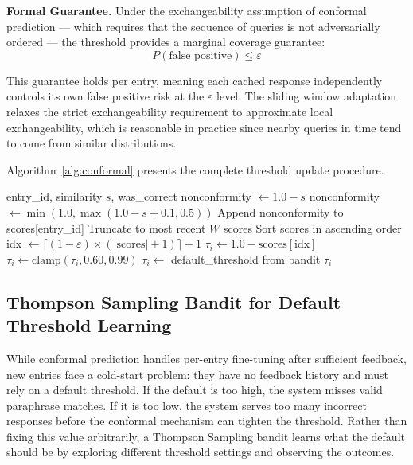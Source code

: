 \documentclass[conference]{IEEEtran}
\begin{document}
\textbf{Formal Guarantee.} Under the exchangeability assumption of conformal prediction --- which requires that the sequence of queries is not adversarially ordered --- the threshold provides a marginal coverage guarantee:
\begin{equation}
P(\text{false positive}) \leq \varepsilon
\label{eq:guarantee}
\end{equation}

This guarantee holds per entry, meaning each cached response independently controls its own false positive risk at the $\varepsilon$ level. The sliding window adaptation relaxes the strict exchangeability requirement to approximate local exchangeability, which is reasonable in practice since nearby queries in time tend to come from similar distributions.

Algorithm~\ref{alg:conformal} presents the complete threshold update procedure.

\begin{algorithm}[t]
\caption{Conformal Threshold Update}
\label{alg:conformal}
\begin{algorithmic}[1]
\REQUIRE entry\_id, similarity $s$, was\_correct
    \STATE nonconformity $\leftarrow 1.0 - s$
\ELSE
    \STATE nonconformity $\leftarrow \min(1.0, \max(1.0 - s + 0.1, 0.5))$
\ENDIF
\STATE Append nonconformity to scores[entry\_id]
    \STATE Truncate to most recent $W$ scores
\ENDIF
{}
    \STATE Sort scores in ascending order
    \STATE idx $\leftarrow \lceil(1 - \varepsilon) \times (|\text{scores}| + 1)\rceil - 1$
    \STATE $\tau_i \leftarrow 1.0 - \text{scores}[\text{idx}]$
    \STATE $\tau_i \leftarrow \text{clamp}(\tau_i, 0.60, 0.99)$
\ELSE
    \STATE $\tau_i \leftarrow$ default\_threshold from bandit
\ENDIF
\RETURN $\tau_i$
\end{algorithmic}
\end{algorithm}

\subsection{Thompson Sampling Bandit for Default Threshold Learning}

While conformal prediction handles per-entry fine-tuning after sufficient feedback, new entries face a cold-start problem: they have no feedback history and must rely on a default threshold. If the default is too high, the system misses valid paraphrase matches. If it is too low, the system serves too many incorrect responses before the conformal mechanism can tighten the threshold. Rather than fixing this value arbitrarily, a Thompson Sampling bandit learns what the default should be by exploring different threshold settings and observing the outcomes.
\end{document}
